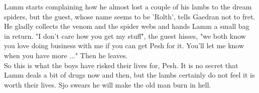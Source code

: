 Lamm starts complaining how he almost lost a couple of his lambs to the dream spiders, but the guest, whose name seems to be 'Rolth', tells Gaedran not to fret. He gladly collects the venom and the spider webs and hands Lamm a small bag in return. "I don't care how you get my stuff", the guest hisses, "we both know you love doing business with me if you can get Pesh for it. You'll let me know when you have more ..." Then he leaves.\\

So this is what the boys have risked their lives for, Pesh. It is no secret that Lamm deals a bit of drugs now and then, but the lambs certainly do not feel it is worth their lives. Sjo swears he will make the old man burn in hell.\\

